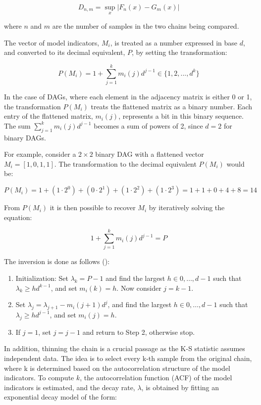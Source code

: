 \documentclass{report}
\begin{document}
$$
D_{n,m} = \sup_x |F_n (x) - G_m (x)|
$$

where $n$ and $m$ are the number of samples in the two chains being compared.

The vector of model indicators, $M_i$, is treated as a number expressed in base $d$, and converted to its decimal equivalent, $P$, by setting the transformation:

$$
P(M_i) = 1 + \sum^k_{j=1} m_i (j) d^{j-1} \in \{1,2, ... , d^k\}
$$

In the case of DAGs, where each element in the adjacency matrix is either 0 or 1, the transformation $P(M_i)$ treats the flattened matrix as a binary number. Each entry of the flattened matrix, $m_i(j)$, represents a bit in this binary sequence. The sum $\sum^k_{j=1} m_i (j) d^{j-1}$ becomes a sum of powers of 2, since $d = 2$ for binary DAGs. 

For example, consider a $2 \times 2$ binary DAG with a flattened vector $M_i = [1, 0, 1, 1]$. The transformation to the decimal equivalent $P(M_i)$ would be:

$$
P(M_i) = 1 + (1 \cdot 2^0) + (0 \cdot 2^1) + (1 \cdot 2^2) + (1 \cdot 2^3) = 1 + 1 + 0 + 4 + 8 = 14 
$$

From $P(M_i)$ it is then possible to recover $M_i$ by iteratively solving the equation:

$$
1 + \sum^k_{j=1} m_i (j) d^{j-1} = P
$$

The inversion is done as follows (\citet{brooks2003nonparametric}):

\begin{enumerate}
	\item Initialization: Set $\lambda_k = P - 1$ and find the largest $h \in {0, \dots, d-1}$ such that $\lambda_k \geq h d^{k-1}$, and set $m_i(k) = h$. Now consider $j = k-1$.
	\item Set $\lambda_j = \lambda_{j+1} - m_i(j+1) d^j$, and find the largest $h \in {0, \dots, d-1}$ such that $\lambda_j \geq h d^{j-1}$, and set $m_i(j) = h$.
	\item If $j = 1$, set $j = j - 1$ and return to Step 2, otherwise stop.
\end{enumerate}

In addition, thinning the chain is a crucial passage as the K-S statistic assumes independent data. The idea is to select every k-th sample from the original chain, where k is determined based on the autocorrelation structure of the model indicators.
To compute $k$, the autocorrelation function (ACF) of the model indicators is estimated, and the decay rate, $\lambda$, is obtained by fitting an exponential decay model of the form:
\end{document}
